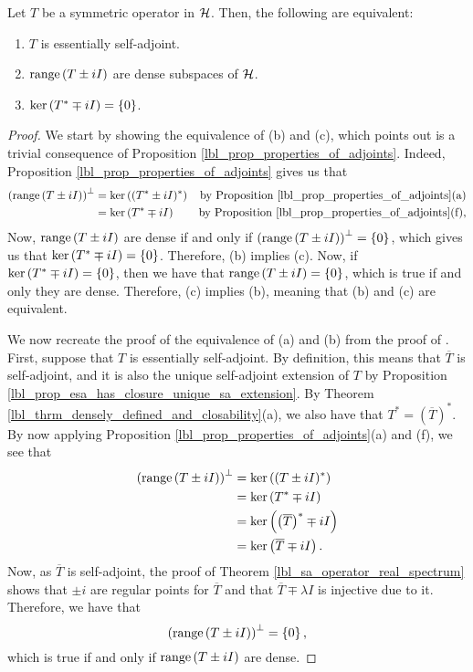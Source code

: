 \begin{theorem}\label{lbl_thrm_esa_criteria}
  Let $T$ be a symmetric operator in $\mathcal{H}$. Then, the following are equivalent:
  \begin{enumerate}[label = (\alph*)]
    \item $T$ is essentially self-adjoint.
    \item $\operatorname{range}\left(T \pm iI\right)$ are dense subspaces of $\mathcal{H}$.
    \item $\operatorname{ker}\left(T^* \mp iI\right) = \left\{0\right\}$.
  \end{enumerate}
\end{theorem}
\begin{proof}
  We start by showing the equivalence of (b) and (c), which {\cite[p.179]{Hall2013}} points out is a trivial consequence of Proposition \eqref{lbl_prop_properties_of_adjoints}. Indeed, Proposition \eqref{lbl_prop_properties_of_adjoints} gives us that
  \begin{align*}
    \left( \operatorname{range}\left(T \pm iI\right) \right)^\perp
    &=
    \operatorname{ker}\left((T^* \pm iI)^*\right) & \text{by Proposition \eqref{lbl_prop_properties_of_adjoints}(a)}\\
    &=
    \operatorname{ker}\left(T^* \mp iI\right) & \text{by Proposition \eqref{lbl_prop_properties_of_adjoints}(f)},
  \end{align*}
  Now, $\operatorname{range}\left(T \pm iI\right)$ are dense if and only if $\left( \operatorname{range}\left(T \pm iI\right) \right)^\perp = \left\{0\right\}$, which gives us that $\operatorname{ker}\left(T^* \mp iI\right) = \left\{0\right\}$. Therefore, (b) implies (c). Now, if $\operatorname{ker}\left(T^* \mp iI\right) = \left\{0\right\}$, then we have that $\operatorname{range}\left(T \pm iI\right) = \left\{0\right\}$, which is true if and only they are dense. Therefore, (c) implies (b), meaning that (b) and (c) are equivalent.

  \medskip

  We now recreate the proof of the equivalence of (a) and (b) from the proof of {\cite[Theorem 9.21]{Hall2013}}. First, suppose that $T$ is essentially self-adjoint. By  definition, this means that $\overline{T}$ is self-adjoint, and it is also the unique self-adjoint extension of $T$ by Proposition \eqref{lbl_prop_esa_has_closure_unique_sa_extension}. By Theorem \eqref{lbl_thrm_densely_defined_and_closability}(a), we also have that $T^* = \left( \overline{T}\right)^*$. By now applying Proposition \eqref{lbl_prop_properties_of_adjoints}(a) and (f), we see that
  \begin{align*}
    \left( \operatorname{range}\left(T \pm iI\right) \right)^\perp
    &=
    \operatorname{ker}\left((T \pm iI)^*\right) \\
    &=
    \operatorname{ker}\left(T^* \mp iI\right) \\
    &=
    \operatorname{ker}\left(\left(\overline{T}\right)^* \mp iI\right) \\
    &=
    \operatorname{ker}\left(\overline{T} \mp iI\right).
  \end{align*}
  Now, as $\overline{T}$ is self-adjoint, the proof of Theorem \eqref{lbl_sa_operator_real_spectrum} shows that $\pm i$ are regular points for $\overline{T}$ and that $\overline{T} \mp \lambda I$ is injective due to it. Therefore, we have that
  \begin{equation*}
    \left( \operatorname{range}\left(T \pm iI\right) \right)^\perp
    =
    \left\{0\right\},
  \end{equation*}
  which is true if and only if $\operatorname{range}\left(T \pm iI\right)$ are dense.


\end{proof}
